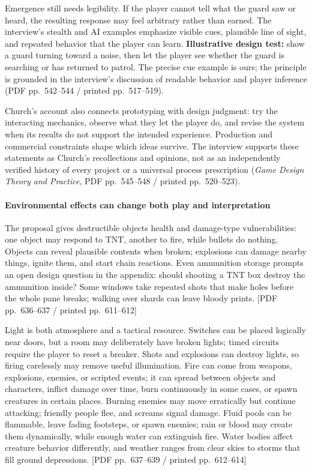 Emergence still needs legibility. If the player cannot tell what the guard saw or heard, the resulting response may feel arbitrary rather than earned. The interview's stealth and AI examples emphasize visible cues, plausible line of sight, and repeated behavior that the player can learn. \textbf{Illustrative design test:} show a guard turning toward a noise, then let the player see whether the guard is searching or has returned to patrol. The precise cue example is ours; the principle is grounded in the interview's discussion of readable behavior and player inference (PDF pp.~542--544 / printed pp.~517--519).

Church's account also connects prototyping with design judgment: try the interacting mechanics, observe what they let the player do, and revise the system when its results do not support the intended experience. Production and commercial constraints shape which ideas survive. The interview supports these statements as Church's recollections and opinions, not as an independently verified history of every project or a universal process prescription (\emph{Game Design Theory and Practice}, PDF pp.~545--548 / printed pp.~520--523).

\paragraph{Environmental effects can change both play and interpretation}\label{05-engine-i-ch009-environmental-effects-can-change-both-play-and-interpretation}

\hypertarget{05-engine-i-ch009-environmental-effects-can-change-both-play-and-interpretation}{}

The proposal gives destructible objects health and damage-type vulnerabilities: one object may respond to TNT, another to fire, while bullets do nothing. Objects can reveal plausible contents when broken; explosions can damage nearby things, ignite them, and start chain reactions. Even ammunition storage prompts an open design question in the appendix: should shooting a TNT box destroy the ammunition inside? Some windows take repeated shots that make holes before the whole pane breaks; walking over shards can leave bloody prints. {[}PDF pp.~636--637 / printed pp.~611--612{]}

Light is both atmosphere and a tactical resource. Switches can be placed logically near doors, but a room may deliberately have broken lights; timed circuits require the player to reset a breaker. Shots and explosions can destroy lights, so firing carelessly may remove useful illumination. Fire can come from weapons, explosions, enemies, or scripted events; it can spread between objects and characters, inflict damage over time, burn continuously in some cases, or spawn creatures in certain places. Burning enemies may move erratically but continue attacking; friendly people flee, and screams signal damage. Fluid pools can be flammable, leave fading footsteps, or spawn enemies; rain or blood may create them dynamically, while enough water can extinguish fire. Water bodies affect creature behavior differently, and weather ranges from clear skies to storms that fill ground depressions. {[}PDF pp.~637--639 / printed pp.~612--614{]}

